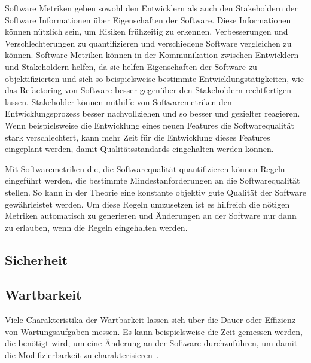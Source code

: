 \documentclass[12pt, a4paper, ngerman]{article}
\begin{document}
Software Metriken geben sowohl den Entwicklern
als auch den Stakeholdern der Software
Informationen über Eigenschaften der Software.
Diese Informationen können nützlich sein,
um Risiken frühzeitig zu erkennen,
Verbesserungen und Verschlechterungen zu quantifizieren
und verschiedene Software vergleichen zu können.
Software Metriken können in der Kommunikation
zwischen Entwicklern und Stakeholdern helfen,
da sie helfen Eigenschaften der Software zu objektifizierten
und sich so beispielsweise bestimmte Entwicklungstätigkeiten,
wie das Refactoring von Software
besser gegenüber den Stakeholdern rechtfertigen lassen.
Stakeholder können mithilfe von Softwaremetriken
den Entwicklungsprozess besser nachvollziehen
und so besser und gezielter reagieren.
Wenn beispielsweise die Entwicklung eines neuen Features
die Softwarequalität stark verschlechtert,
kann mehr Zeit für die Entwicklung dieses Features
eingeplant werden, damit Qualitätsstandards eingehalten werden können.

Mit Softwaremetriken die,
die Softwarequalität quantifizieren
können Regeln eingeführt werden,
die bestimmte Mindestanforderungen an die Softwarequalität stellen.
So kann in der Theorie eine konstante objektiv gute Qualität der Software
gewährleistet werden.
Um diese Regeln umzusetzen ist es hilfreich
die nötigen Metriken automatisch zu generieren
und Änderungen an der Software nur dann zu erlauben,
wenn die Regeln eingehalten werden.

\subsection{Sicherheit}



\subsection{Wartbarkeit}

Viele Charakteristika der Wartbarkeit lassen sich über die Dauer oder Effizienz von Wartungsaufgaben messen.
Es kann beispielsweise die Zeit gemessen werden, die benötigt wird,
um eine Änderung an der Software durchzuführen,
um damit die Modifizierbarkeit zu charakterisieren~\cite{maintainability_metrics}.%
\end{document}
